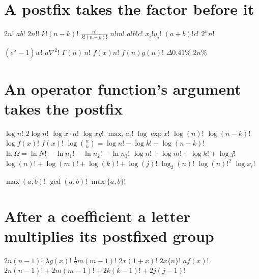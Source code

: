 \documentclass{article}
\begin{document}
\section{A postfix takes the factor before it}
$2n!$ $ab!$ $2n!!$ $k!(n-k)!$ $\frac{n!}{k!(n-k)!}$ $n!m!$ $a!b!c!$ $x_i!y_j!$ $(a+b)!c!$ $2^{n}n!$

$(e^{\lambda}-1)w!$ $a\nabla^{2}!$ $\Gamma(n)\,n!$ $f(x)n!$ $f(n)g(n)!$ $\Delta 0.41\%$ $2n\%$

\section{An operator function's argument takes the postfix}
$\log n!$ $2\log n!$ $\log x\cdot n!$ $\log xy!$ $\max_{i}a_{i}!$ $\log\exp x!$ $\log(n)!$ $\log(n-k)!$ $\log f(x)!$
$f(x)!$ $\log\binom{n}{k}=\log n!-\log k!-\log(n-k)!$ $\ln\Omega=\ln N!-\ln n_{1}!-\ln n_{2}!-\ln n_{3}!$
$\log n!+\log m!+\log k!+\log j!$ $\log(n)!+\log(m)!+\log(k)!+\log(j)!$ $\log_2(n)!$ $\log(n)!^{2}$ $\log x_{i}!$

$\max(a,b)!$ $\gcd(a,b)!$ $\max\{a,b\}!$

\section{After a coefficient a letter multiplies its postfixed group}
$2n(n-1)!$ $\lambda g(x)!$ $\frac12 m(m-1)!$ $2x(1+x)!$ $2x\{n\}!$ $af(x)!$
$2n(n-1)!+2m(m-1)!+2k(k-1)!+2j(j-1)!$
\end{document}

